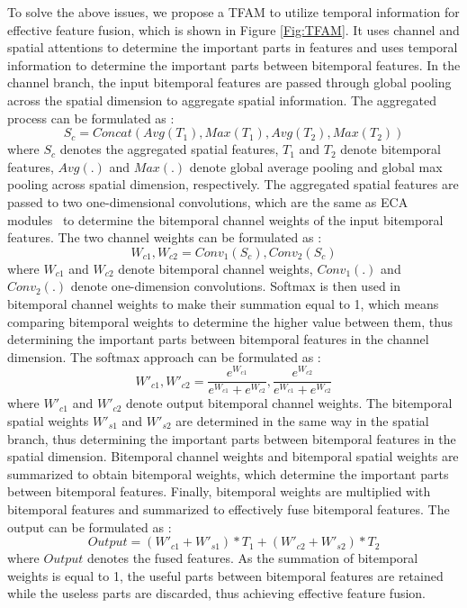 \documentclass[journal]{IEEEtran}
\begin{document}
To solve the above issues, we propose a TFAM to utilize temporal information for effective feature fusion, which is shown in Figure \ref{Fig:TFAM}. It uses channel and spatial attentions to determine the important parts in features and uses temporal information to determine the important parts between bitemporal features. In the channel branch, the input bitemporal features are passed through global pooling across the spatial dimension to aggregate spatial information. The aggregated process can be formulated as :
\begin{equation}
    S_c = Concat(Avg(T_1),Max(T_1),Avg(T_2),Max(T_2))
\end{equation}
where $S_c$ denotes the aggregated spatial features, $T_1$ and $T_2$ denote bitemporal features, $Avg(.)$ and $Max(.)$ denote global average pooling and global max pooling across spatial dimension, respectively. The aggregated spatial features are passed to two one-dimensional convolutions, which are the same as ECA modules~\cite{eca} to determine the bitemporal channel weights of the input bitemporal features. The two channel weights can be formulated as : 
\begin{equation}
    W_{c1}, W_{c2} = Conv_1(S_c), Conv_2(S_c)
\end{equation}
where $W_{c1}$ and $W_{c2}$ denote bitemporal channel weights, $Conv_1(.)$ and $Conv_2(.)$ denote one-dimension convolutions. Softmax is then used in bitemporal channel weights to make their summation equal to 1, which means comparing bitemporal weights to determine the higher value between them, thus determining the important parts between bitemporal features in the channel dimension. The softmax approach can be formulated as :
\begin{equation}
    W'_{c1}, W'_{c2} = \frac{e^{W_{c1}}}{e^{W_{c1}}+e^{W_{c2}}}, \frac{e^{W_{c2}}}{e^{W_{c1}}+e^{W_{c2}}}
\end{equation}
where $W'_{c1}$ and $ W'_{c2}$ denote output bitemporal channel weights. The bitemporal spatial weights $W'_{s1}$ and $ W'_{s2}$ are determined in the same way in the spatial branch, thus determining the important parts between bitemporal features in the spatial dimension. Bitemporal channel weights and bitemporal spatial weights are summarized to obtain bitemporal weights, which determine the important parts between bitemporal features. Finally, bitemporal weights are multiplied with bitemporal features and summarized to effectively fuse bitemporal features. The output can be formulated as :
\begin{equation}
    Output = (W'_{c1} + W'_{s1}) * T_1 + (W'_{c2} + W'_{s2}) * T_2
\end{equation}
where $Output$ denotes the fused features. As the summation of bitemporal weights is equal to 1, the useful parts between bitemporal features are retained while the useless parts are discarded, thus achieving effective feature fusion.
\end{document}
